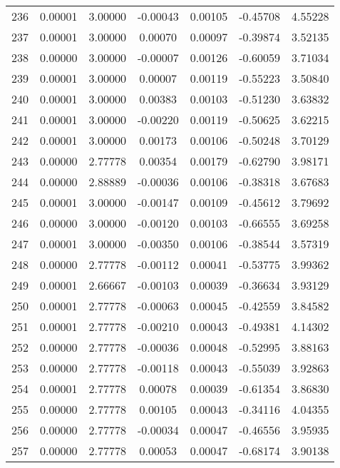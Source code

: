\begin{longtable}{c c c c c c c}
236 &  0.00001 &      3.00000 & -0.00043 &   0.00105 &  -0.45708 &   4.55228 \\
237 &  0.00001 &      3.00000 &  0.00070 &   0.00097 &  -0.39874 &   3.52135 \\
238 &  0.00000 &      3.00000 & -0.00007 &   0.00126 &  -0.60059 &   3.71034 \\
239 &  0.00001 &      3.00000 &  0.00007 &   0.00119 &  -0.55223 &   3.50840 \\
240 &  0.00001 &      3.00000 &  0.00383 &   0.00103 &  -0.51230 &   3.63832 \\
241 &  0.00001 &      3.00000 & -0.00220 &   0.00119 &  -0.50625 &   3.62215 \\
242 &  0.00001 &      3.00000 &  0.00173 &   0.00106 &  -0.50248 &   3.70129 \\
243 &  0.00000 &      2.77778 &  0.00354 &   0.00179 &  -0.62790 &   3.98171 \\
244 &  0.00000 &      2.88889 & -0.00036 &   0.00106 &  -0.38318 &   3.67683 \\
245 &  0.00001 &      3.00000 & -0.00147 &   0.00109 &  -0.45612 &   3.79692 \\
246 &  0.00000 &      3.00000 & -0.00120 &   0.00103 &  -0.66555 &   3.69258 \\
247 &  0.00001 &      3.00000 & -0.00350 &   0.00106 &  -0.38544 &   3.57319 \\
248 &  0.00000 &      2.77778 & -0.00112 &   0.00041 &  -0.53775 &   3.99362 \\
249 &  0.00001 &      2.66667 & -0.00103 &   0.00039 &  -0.36634 &   3.93129 \\
250 &  0.00001 &      2.77778 & -0.00063 &   0.00045 &  -0.42559 &   3.84582 \\
251 &  0.00001 &      2.77778 & -0.00210 &   0.00043 &  -0.49381 &   4.14302 \\
252 &  0.00000 &      2.77778 & -0.00036 &   0.00048 &  -0.52995 &   3.88163 \\
253 &  0.00000 &      2.77778 & -0.00118 &   0.00043 &  -0.55039 &   3.92863 \\
254 &  0.00001 &      2.77778 &  0.00078 &   0.00039 &  -0.61354 &   3.86830 \\
255 &  0.00000 &      2.77778 &  0.00105 &   0.00043 &  -0.34116 &   4.04355 \\
256 &  0.00000 &      2.77778 & -0.00034 &   0.00047 &  -0.46556 &   3.95935 \\
257 &  0.00000 &      2.77778 &  0.00053 &   0.00047 &  -0.68174 &   3.90138 \\

\end{longtable}
